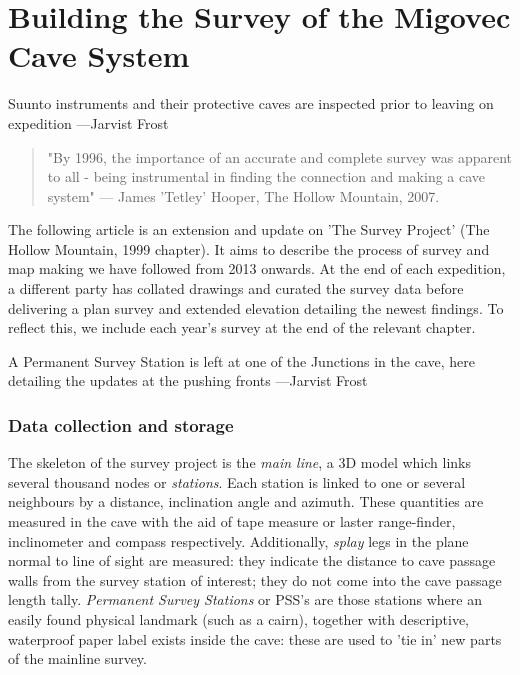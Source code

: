 \chapter{Building the Survey of the Migovec Cave System}
\begin{marginfigure}
\checkoddpage \ifoddpage \forcerectofloat \else \forceversofloat \fi
\centering
 \caption{Suunto instruments and their protective caves are inspected prior to leaving on expedition ---Jarvist Frost}
 \label{compass}
\end{marginfigure}

\begin{quote}
"By 1996, the importance of an accurate and complete survey was apparent to all - being instrumental  in finding the connection and making a cave system" --- James 'Tetley' Hooper, The Hollow Mountain, 2007. 
\end{quote}

The following article is an extension and update  on 'The Survey Project' (The Hollow Mountain, 1999 chapter). It aims to describe the process of survey and map making we have followed from 2013 onwards. At the end of each expedition, a different party has collated drawings and curated the survey data before delivering a plan survey and extended elevation detailing the newest findings. To reflect this, we include each year's survey at the end of the relevant chapter.

\begin{marginfigure}
\checkoddpage \ifoddpage \forcerectofloat \else \forceversofloat \fi
\centering
 \caption{A Permanent Survey Station is left at one of the Junctions in the cave, here detailing the updates at the pushing fronts ---Jarvist Frost}
 \label{PSS}
\end{marginfigure}


\subsection{Data collection and storage}
The skeleton of the survey project is the \emph{main line}, a 3D model which links several thousand nodes or \emph{stations}. Each station is linked to one or several neighbours by a distance, inclination angle and azimuth. These quantities are measured in the cave with the aid of tape measure or laster range-finder, inclinometer and compass respectively. Additionally, \emph{splay} legs in the plane normal to line of sight are measured: they indicate the distance to cave passage walls from the survey station of interest; they do not come into the cave passage length tally. \emph{Permanent Survey Stations} or PSS's are those stations where an easily found physical landmark (such as a cairn), together with descriptive, waterproof paper label exists inside the cave: these are used to 'tie in' new parts of the mainline survey.

